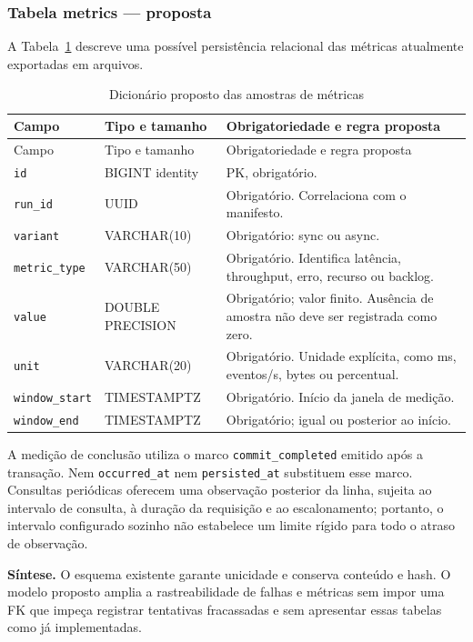 \subsubsection{Tabela metrics --- proposta}
A Tabela~\ref{tab:dic-metrics} descreve uma possível persistência relacional das métricas atualmente exportadas em arquivos.
{\small
\begin{longtable}{>{\raggedright\arraybackslash}p{}>{\raggedright\arraybackslash}p{}>{\raggedright\arraybackslash}p{}}
\caption{Dicionário proposto das amostras de métricas}\label{tab:dic-metrics}\\
\hline Campo & Tipo e tamanho & Obrigatoriedade e regra proposta\\ \hline
\endfirsthead
\hline Campo & Tipo e tamanho & Obrigatoriedade e regra proposta\\ \hline
\endhead
\texttt{id} & BIGINT identity & PK, obrigatório.\\ \hline
\texttt{run\_id} & UUID & Obrigatório. Correlaciona com o manifesto.\\ \hline
\texttt{variant} & VARCHAR(10) & Obrigatório: sync ou async.\\ \hline
\texttt{metric\_type} & VARCHAR(50) & Obrigatório. Identifica latência, throughput, erro, recurso ou backlog.\\ \hline
\texttt{value} & DOUBLE PRECISION & Obrigatório; valor finito. Ausência de amostra não deve ser registrada como zero.\\ \hline
\texttt{unit} & VARCHAR(20) & Obrigatório. Unidade explícita, como ms, eventos/s, bytes ou percentual.\\ \hline
\texttt{window\_start} & TIMESTAMPTZ & Obrigatório. Início da janela de medição.\\ \hline
\texttt{window\_end} & TIMESTAMPTZ & Obrigatório; igual ou posterior ao início.\\ \hline
\end{longtable}
\par
}

A medição de conclusão utiliza o marco \texttt{commit\_completed} emitido após a transação. Nem \texttt{occurred\_at} nem \texttt{persisted\_at} substituem esse marco. Consultas periódicas oferecem uma observação posterior da linha, sujeita ao intervalo de consulta, à duração da requisição e ao escalonamento; portanto, o intervalo configurado sozinho não estabelece um limite rígido para todo o atraso de observação.

\textbf{Síntese.} O esquema existente garante unicidade e conserva conteúdo e hash. O modelo proposto amplia a rastreabilidade de falhas e métricas sem impor uma FK que impeça registrar tentativas fracassadas e sem apresentar essas tabelas como já implementadas.
